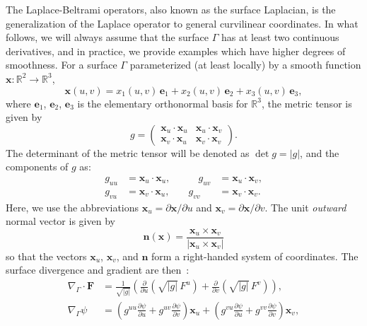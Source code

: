 \documentclass[11pt]{article}
\newcommand{\exx}{\mathbf{e}_1}
\newcommand{\eyy}{\mathbf{e}_2}
\newcommand{\ezz}{\mathbf{e}_3}
\newcommand{\surfdiv}{\nabla_\Gamma \cdot}
\newcommand{\surfgrad}{\nabla_\Gamma}
\newcommand{\bbR}{\mathbb R}
\newcommand{\bn}{\bm n}
\newcommand{\bx}{\bm x}
\newcommand{\bF}{\bm F}
\numberwithin{equation}{section}
\begin{document}
The Laplace-Beltrami operators, also known as the surface Laplacian,
is the generalization of the Laplace operator to general curvilinear
coordinates. 
In what follows, we will always assume that the surface $\Gamma$ has
at least two continuous derivatives, and in practice, we provide examples
which have higher degrees of smoothness.
For a surface $\Gamma$ parameterized (at least locally) by a
smooth function $\bx: \bbR^2 \to \bbR^3$,
\begin{equation}\label{eq_triparam}
\bx(u,v) = x_1(u,v) \, \exx + x_2(u,v) \, \eyy + x_3(u,v) \, \ezz,
\end{equation}
where $\exx$, $\eyy$, $\ezz$ is the elementary orthonormal basis for
$\bbR^3$, the metric tensor is given by
\begin{equation}
g = \begin{pmatrix}
\bx_u  \cdot \bx_u & 
\bx_u  \cdot \bx_v \\
\bx_v  \cdot \bx_u & 
\bx_v  \cdot \bx_v
\end{pmatrix}.
\end{equation}
The determinant of the metric tensor will be denoted as $\det g =
|g|$, and the components of $g$ as:
\begin{equation}
\begin{aligned}
 g_{uu} &= \bx_u \cdot \bx_u, &\qquad g_{uv} &= \bx_u \cdot \bx_v, \\
 g_{vu} &= \bx_v \cdot \bx_u, &\quad g_{vv} &= \bx_v \cdot \bx_v.
\end{aligned}
\end{equation}
Here, we use the abbreviations $\bx_u = \partial \bx/\partial u$ and 
$\bx_v = \partial \bx/\partial v$.
The unit \emph{outward} normal vector is given by
\begin{equation}
\bn(\bx) = \frac{\bx_u \times \bx_v}{|\bx_u \times \bx_v|}
\end{equation}
so that the vectors $\bx_u$, $\bx_v$, and $\bn$ form a right-handed
system of coordinates.
The surface divergence and gradient are then~\cite{frankel,nedelec}:
\begin{equation}
  \begin{aligned}
    \surfdiv \bF &= \frac{1}{\sqrt{ |g|}} \left(
      \frac{\partial}{\partial u} \left( \sqrt{|g|} \, F^u  \right)+ 
      \frac{\partial}{\partial v} \left( \sqrt{|g|} \, F^v \right) 
    \right), \\
    \surfgrad \psi 
    &=  \left( g^{uu}
      \frac{\partial \psi}{\partial  u}
      + g^{uv} \frac{\partial \psi}{\partial v} \right)  \bx_u + 
    \left( g^{vu} \frac{\partial \psi}{\partial u} +
      g^{vv} \frac{\partial \psi}{\partial v}
        \right) \bx_v,    
  \end{aligned}
\end{equation}
\end{document}
